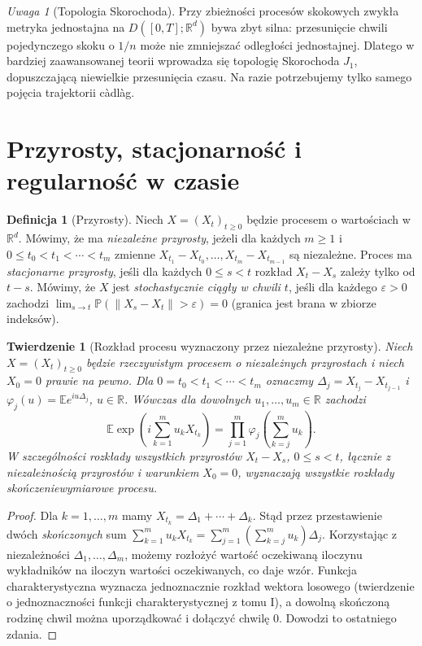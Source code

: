 \documentclass[11pt,a4paper,oneside]{report}
\numberwithin{equation}{chapter}
\theoremstyle{plain}
\newtheorem{twierdzenie}{Twierdzenie}[chapter]
\theoremstyle{definition}
\newtheorem{definicja}{Definicja}[chapter]
\theoremstyle{remark}
\newtheorem{uwaga}{Uwaga}[chapter]
\newcommand{\R}{\mathbb{R}}
\newcommand{\Prob}{\mathbb{P}}
\newcommand{\E}{\mathbb{E}}
\newcommand{\norm}[1]{\lVert #1\rVert}
\begin{document}
\begin{uwaga}[Topologia Skorochoda]
Przy zbieżności procesów skokowych zwykła metryka
jednostajna na $D([0,T];\R^d)$ bywa zbyt silna:
przesunięcie chwili pojedynczego skoku o $1/n$
może nie zmniejszać odległości jednostajnej.
Dlatego w bardziej zaawansowanej teorii wprowadza się
topologię Skorochoda $J_1$, dopuszczającą niewielkie
przesunięcia czasu. Na razie potrzebujemy tylko
samego pojęcia trajektorii c\`adl\`ag.
\end{uwaga}

\section{Przyrosty, stacjonarność i regularność w czasie}
\begin{definicja}[Przyrosty]
Niech $X=(X_t)_{t\ge0}$ będzie procesem o wartościach w $\R^d$.
Mówimy, że ma \emph{niezależne przyrosty}, jeżeli dla
każdych $m\ge1$ i $0\le t_0<t_1<\cdots<t_m$
zmienne $X_{t_1}-X_{t_0},\ldots,X_{t_m}-X_{t_{m-1}}$
są niezależne. Proces ma \emph{stacjonarne przyrosty}, jeśli
dla każdych $0\le s<t$ rozkład $X_t-X_s$ zależy tylko od $t-s$.
Mówimy, że $X$ jest \emph{stochastycznie ciągły w chwili $t$},
jeśli dla każdego $\varepsilon>0$ zachodzi
$\lim_{s\to t}\Prob(\norm{X_s-X_t}>\varepsilon)=0$
(granica jest brana w zbiorze indeksów).
\end{definicja}


\begin{twierdzenie}[Rozkład procesu wyznaczony przez niezależne przyrosty]
Niech $X=(X_t)_{t\ge0}$ będzie rzeczywistym procesem
o niezależnych przyrostach i niech $X_0=0$ prawie na pewno.
Dla $0=t_0<t_1<\cdots<t_m$ oznaczmy
$\Delta_j=X_{t_j}-X_{t_{j-1}}$ i
$\varphi_j(u)=\E e^{iu\Delta_j}$, $u\in\R$.
Wówczas dla dowolnych $u_1,\ldots,u_m\in\R$ zachodzi
\[
\E\exp\left(i\sum_{k=1}^m u_k X_{t_k}\right)
=\prod_{j=1}^m\varphi_j\left(\sum_{k=j}^m u_k\right).
\]
W szczególności rozkłady wszystkich przyrostów
$X_t-X_s$, $0\le s<t$, łącznie z niezależnością
przyrostów i warunkiem $X_0=0$, wyznaczają
wszystkie rozkłady skończeniewymiarowe procesu.
\end{twierdzenie}
\begin{proof}
Dla $k=1,\ldots,m$ mamy
$X_{t_k}=\Delta_1+\cdots+\Delta_k$.
Stąd przez przestawienie dwóch \emph{skończonych} sum
$\sum_{k=1}^m u_k X_{t_k}
=\sum_{j=1}^m(\sum_{k=j}^m u_k)\Delta_j$.
Korzystając z niezależności $\Delta_1,\ldots,\Delta_m$,
możemy rozłożyć wartość oczekiwaną iloczynu
wykładników na iloczyn wartości oczekiwanych,
co daje wzór. Funkcja charakterystyczna wyznacza
jednoznacznie rozkład wektora losowego (twierdzenie
o jednoznaczności funkcji charakterystycznej z tomu I),
a dowolną skończoną rodzinę chwil można uporządkować
i dołączyć chwilę $0$. Dowodzi to ostatniego zdania.
\end{proof}
\end{document}

